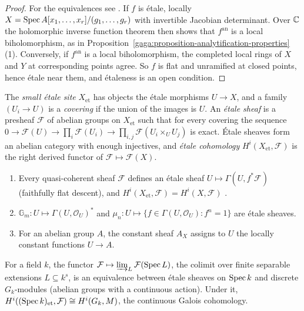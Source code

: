\begin{proof}
For the equivalences see \cite[Chapter I]{milne-etale}. If $f$ is \'etale, locally $X = \operatorname{Spec} A[x_1, \ldots, x_r]/(g_1, \ldots, g_r)$ with invertible Jacobian determinant. Over
$\mathbb{C}$ the holomorphic inverse function theorem then shows that $f^{\mathrm{an}}$ is a local biholomorphism, as in Proposition~\ref{gaga:proposition-analytification-properties}(1).
Conversely, if $f^{\mathrm{an}}$ is a local biholomorphism, the completed local rings of $X$ and $Y$ at corresponding points agree. So $f$ is flat and unramified at closed points, hence
\'etale near them, and \'etaleness is an open condition.
\end{proof}

\begin{definition}\label{etale-cohomology:definition-etale-site}
The \emph{small \'etale site} $X_{\mathrm{et}}$ has objects the \'etale morphisms $U \to X$, and a family $(U_i \to U)$ is a \emph{covering} if the union of the images is $U$. An \emph{\'etale
sheaf} is a presheaf $\mathcal{F}$ of abelian groups on $X_{\mathrm{et}}$ such that for every covering the sequence
$0 \to \mathcal{F}(U) \to \prod_i\mathcal{F}(U_i) \to \prod_{i,j}\mathcal{F}(U_i \times_UU_j)$ is exact. \'Etale sheaves form an abelian category with enough injectives, and
\emph{\'etale cohomology} $H^i(X_{\mathrm{et}}, \mathcal{F})$ is the right derived functor of $\mathcal{F} \mapsto \mathcal{F}(X)$.
\end{definition}

\begin{example}\label{etale-cohomology:example-etale-sheaves}
\begin{enumerate}
\item Every quasi-coherent sheaf $\mathcal{F}$ defines an \'etale sheaf $U \mapsto \Gamma(U, f^*\mathcal{F})$ (faithfully flat descent), and $H^i(X_{\mathrm{et}}, \mathcal{F}) = H^i(X, \mathcal{F})$
\cite[Chapter III]{milne-etale}.
\item $\mathbb{G}_m \colon U \mapsto \Gamma(U, \mathcal{O}_U)^*$ and $\mu_n \colon U \mapsto \{f \in \Gamma(U, \mathcal{O}_U) : f^n = 1\}$ are \'etale sheaves.
\item For an abelian group $A$, the constant sheaf $A_X$ assigns to $U$ the locally constant functions $U \to A$.
\end{enumerate}
\end{example}

\begin{proposition}\label{etale-cohomology:proposition-galois}
For a field $k$, the functor $\mathcal{F} \mapsto \varinjlim_{L}\mathcal{F}(\operatorname{Spec} L)$, the colimit over finite separable extensions $L \subseteq k^s$, is an equivalence between \'etale sheaves on
$\operatorname{Spec} k$ and discrete $G_k$-modules (abelian groups with a continuous action). Under it, $H^i((\operatorname{Spec} k)_{\mathrm{et}}, \mathcal{F}) \cong H^i(G_k, M)$, the continuous Galois cohomology.
\end{proposition}

